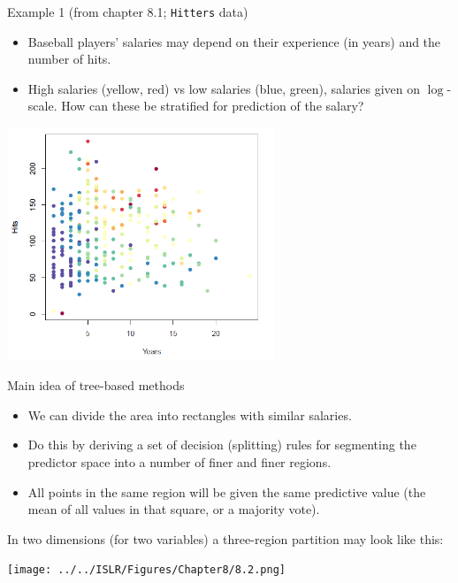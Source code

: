 \documentclass[10pt,ignorenonframetext,]{beamer}
\begin{document}
\begin{frame}[fragile]

\begin{block}{Example 1 (from chapter 8.1; \texttt{Hitters} data)}

\vspace{1mm}

\begin{itemize}
\item
  Baseball players' salaries may depend on their experience (in years)
  and the number of hits.
\item
  High salaries (yellow, red) vs low salaries (blue, green), salaries
  given on \(\log\)-scale. How can these be stratified for prediction of
  the salary?
\end{itemize}

\centering
\includegraphics[width=0.60000\textwidth]{hits.png}

\end{block}

\end{frame}

\begin{frame}

\begin{block}{Main idea of tree-based methods}

\begin{itemize}
\item
  We can divide the area into rectangles with similar salaries.
\item
  Do this by deriving a set of decision (splitting) rules for segmenting
  the predictor space into a number of finer and finer regions.
\item
  All points in the same region will be given the same predictive value
  (the mean of all values in that square, or a majority vote).
\end{itemize}

In two dimensions (for two variables) a three-region partition may look
like this:

\centering
\texttt{[image: ../../ISLR/Figures/Chapter8/8.2.png]}

\end{block}

\end{frame}
\end{document}
